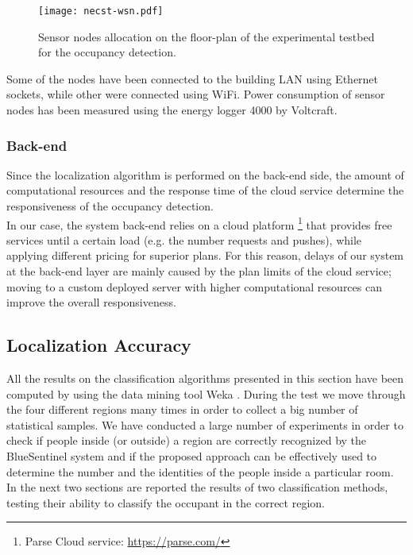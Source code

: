 \begin{figure}[h!tb]
\centering\texttt{[image: necst-wsn.pdf]}
\caption[Sensor nodes allocation on the floor-plan of the experimental testbed for the occupancy detection.]{Sensor nodes allocation on the floor-plan of the experimental testbed for the occupancy detection.}
\label{fig:wsn-sketch}
\end{figure}

Some of the nodes have been connected to the building LAN using Ethernet sockets, while other were connected using WiFi.
Power consumption of sensor nodes has been measured using the energy logger 4000 by Voltcraft.

\subsubsection{Back-end}
\label{sub:test-backend}
Since the localization algorithm is performed on the back-end side, the amount of computational resources and the response time of the cloud service determine the responsiveness of the occupancy detection.\\
In our case, the system back-end relies on a cloud platform
\footnote{Parse Cloud service: \url{https://parse.com/}}
that provides free services until a certain load (e.g. the number requests and pushes), while applying different pricing for superior plans.
For this reason, delays of our system at the back-end layer are mainly caused by the plan limits of the cloud service; moving to a custom deployed server with higher computational resources can improve the overall responsiveness.

\subsection{Localization Accuracy}
\label{sec:loc-accuracy}
All the results on the classification algorithms presented in this section have been computed by using the data mining tool Weka \cite{Hall2009}.
During the test we move through the four different regions many times in order to collect a big number of statistical samples.
We have conducted a large number of experiments in order to check if people inside (or outside) a region are correctly recognized by the BlueSentinel system and if the proposed approach can be effectively used to determine the number and the identities of the people inside a particular room.
In the next two sections are reported the results of two classification methods, testing their ability to classify the occupant in the correct region.

